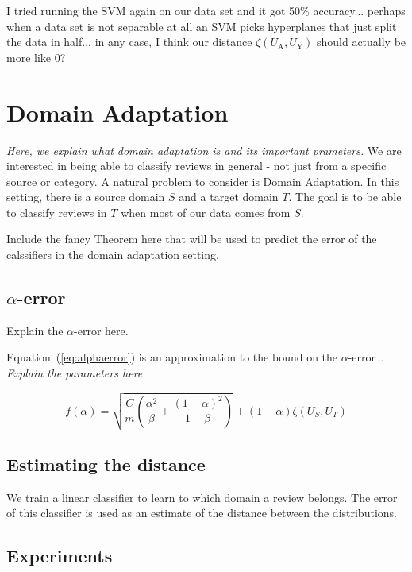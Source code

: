 \documentclass[letterpaper]{article}
\begin{document}
I tried running the SVM again on our data set and it got 50\% accuracy... perhaps when a data set is not separable at all an SVM picks hyperplanes that just split the data in half... in any case, I think our distance $\zeta(U_{\textrm{A}}, U_{\textrm{Y}})$ should actually be more like 0?

\section{Domain Adaptation}
\label{sec:background}

\emph{Here, we explain what domain adaptation is and its important
prameters.}
We are interested in being able to classify reviews in general - not
just from a specific source or category. A natural problem to consider
is Domain Adaptation. In this setting, there is a source domain $S$
and a target domain $T$. The goal is to be able to classify reviews in
$T$ when most of our data comes from $S$. 

Include the fancy Theorem here that will be used to predict the error
of the calssifiers in the domain adaptation setting.


\subsection{$\alpha$-error}
\label{sec:alpha-error}

Explain the $\alpha$-error here.

Equation~(\ref{eq:alphaerror}) is an approximation to the bound on the
$\alpha$-error~\cite{JennLearnDiffDomains}. \emph{Explain the parameters here}

\begin{equation}
  \label{eq:alphaerror}
  f(\alpha)=\sqrt{\frac{C}{m}\left(\frac{\alpha^2}{\beta} + \frac{(1-\alpha)^2}{1-\beta}\right)}+(1-\alpha)\zeta(U_S,U_T)
\end{equation}

\subsection{Estimating the distance}
\label{sec:estimating-distance}

We train a linear classifier to learn to which domain a review
belongs. The error of this classifier is used as an estimate of the
distance between the distributions.


\subsection{Experiments}
\label{sec:domain-adaptation}
\end{document}
